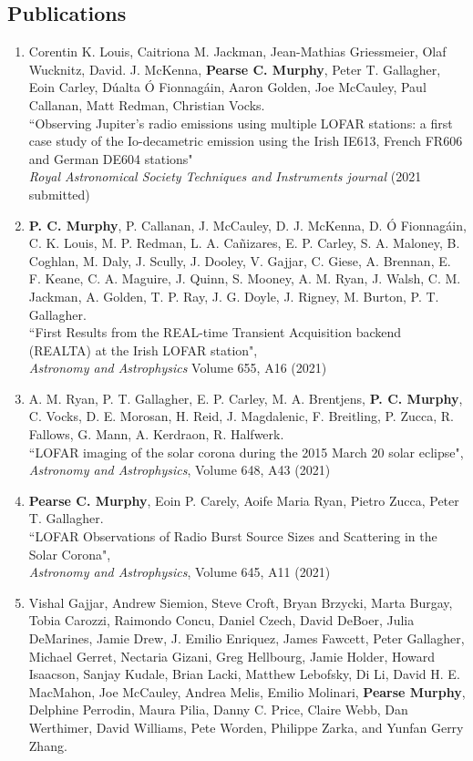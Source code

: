 \begin{singlespace}
\section*{Publications}
\begin{enumerate}
\item Corentin K. Louis, Caitriona M. Jackman, Jean-Mathias Griessmeier, Olaf Wucknitz, David. J. McKenna, \textbf{Pearse C. Murphy}, Peter T. Gallagher, Eoin Carley, Dúalta Ó Fionnagáin, Aaron Golden, Joe McCauley, Paul Callanan, Matt Redman, Christian Vocks.
\\``Observing Jupiter's radio emissions using multiple LOFAR stations: a first case study of the Io-decametric emission using the Irish IE613, French FR606 and German DE604 stations"
\\ \textit{Royal Astronomical Society Techniques and Instruments journal} (2021 submitted)
\item \textbf{P. C. Murphy}, P. Callanan, J. McCauley, D. J. McKenna, D. Ó Fionnagáin, C. K. Louis, M. P. Redman, L. A. Cañizares, E. P. Carley, S. A. Maloney, B. Coghlan, M. Daly, J. Scully, J. Dooley, V. Gajjar, C. Giese, A. Brennan, E. F. Keane, C. A. Maguire, J. Quinn, S. Mooney, A. M. Ryan, J. Walsh, C. M. Jackman, A. Golden, T. P. Ray, J. G. Doyle, J. Rigney, M. Burton, P. T. Gallagher.
\\``First Results from the REAL-time Transient Acquisition backend (REALTA) at the Irish LOFAR station",
\\ \textit{Astronomy and Astrophysics} Volume 655, A16 (2021)
\item A. M. Ryan, P. T. Gallagher, E. P. Carley, M. A. Brentjens,\textbf{ P. C. Murphy}, C. Vocks, D. E. Morosan, H. Reid, J. Magdalenic, F. Breitling, P. Zucca, R. Fallows, G. Mann, A. Kerdraon, R. Halfwerk.
\\``LOFAR imaging of the solar corona during the 2015 March 20 solar eclipse",
\\ \textit{Astronomy and Astrophysics}, Volume 648, A43 (2021)
\item \textbf{Pearse C. Murphy}, Eoin P. Carely, Aoife Maria Ryan, Pietro Zucca, Peter T. Gallagher.
\\ ``LOFAR Observations of Radio Burst Source Sizes and Scattering in the Solar Corona",
\\ \textit{Astronomy and Astrophysics}, Volume 645, A11 (2021)
\item Vishal Gajjar, Andrew Siemion, Steve Croft, Bryan Brzycki, Marta Burgay, Tobia Carozzi, Raimondo Concu, Daniel Czech, David DeBoer, Julia DeMarines, Jamie Drew, J. Emilio Enriquez, James Fawcett, Peter Gallagher, Michael Gerret, Nectaria Gizani, Greg Hellbourg, Jamie Holder, Howard Isaacson, Sanjay Kudale, Brian Lacki, Matthew Lebofsky, Di Li, David H. E. MacMahon, Joe McCauley, Andrea Melis, Emilio Molinari, \textbf{Pearse Murphy}, Delphine Perrodin, Maura Pilia, Danny C. Price, Claire Webb, Dan Werthimer, David Williams, Pete Worden, Philippe Zarka, and Yunfan Gerry Zhang.

\end{enumerate}
\end{singlespace}
